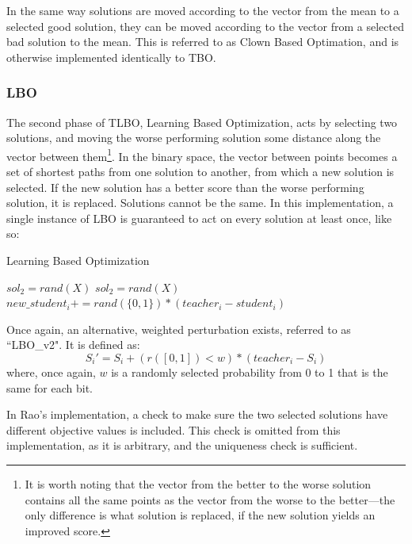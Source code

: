 \documentclass[11pt, letterpaper, onecolumn]{article}
\begin{document}
In the same way solutions are moved according to the vector from the mean to a selected good solution, they can be moved according to the vector from a selected bad solution to the mean. This is referred to as Clown Based Optimation, and is otherwise implemented identically to TBO. 

\subsubsection{LBO}

The second phase of TLBO, Learning Based Optimization, acts by selecting two solutions, and moving the worse performing solution some distance along the vector between them\footnote{It is worth noting that the vector from the better to the worse solution contains all the same points as the vector from the worse to the better---the only difference is what solution is replaced, if the new solution yields an improved score.}. In the binary space, the vector between points becomes a set of shortest paths from one solution to another, from which a new solution is selected.  If the new solution has a better score than the worse performing solution, it is replaced. Solutions cannot be the same. In this implementation, a single instance of LBO is guaranteed to act on every solution at least once, like so:

\begin{algorithm}
\caption{Learning Based Optimization}
\begin{algorithmic}
\STATE $sol_2 = rand(X)$
\STATE $sol_2 = rand(X)$
\ENDWHILE
{}
\STATE $new\_student_i \mathrel{{+}{=}} rand(\{0,1\}) * (teacher_i - student_i)$
\ENDFOR
{}
\ENDIF
\ENDFOR
\end{algorithmic}
\end{algorithm}

Once again, an alternative, weighted perturbation exists, referred to as ``LBO\_v2". It is defined as:
\begin{equation}
S_i' = S_i + (r([0,1])<w)*(teacher_i - S_i)
\end{equation}
where, once again, $w$ is a randomly selected probability from 0 to 1 that is the same for each bit. 

In Rao's implementation, a check to make sure the two selected solutions have different objective values is included. This check is omitted from this implementation, as it is arbitrary, and the uniqueness check is sufficient. 
\end{document}
